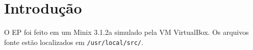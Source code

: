 \documentclass{amsart}
\title[]{\rule{10.5cm}{0.8pt}\\Exercício-Programa 2:\\
Escalonamento de Processos
\\\vspace{2mm}\footnotesize
  Sistemas Operacionais -- MAC0422\\\rule{10cm}{0.8pt}}
\author[]{Renato Lui Geh\\NUSP\@: 8536030\\
          Guilherme Freire\\NUSP\@: }
\theoremstyle{plain}
\newcommand{\code}[1]{\lstinline[mathescape=true]{#1}}
\begin{document}
\date{\today}
\maketitle

\section{Introdução}

O EP foi feito em um Minix 3.1.2a simulado pela VM VirtualBox. Os arquivos fonte estão localizados
em \code{/usr/local/src/}.
\end{document}
